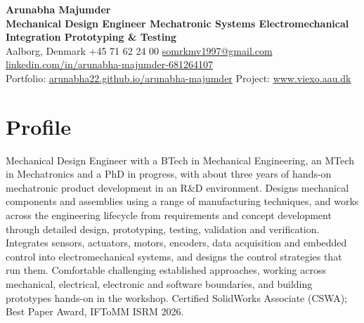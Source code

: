 \documentclass[10pt,a4paper]{article}
\begin{document}
{\LARGE\bfseries Arunabha Majumder}\\[2pt]
\textbf{Mechanical Design Engineer \textbar{} Mechatronic Systems \textbar{} Electromechanical Integration \textbar{} Prototyping \& Testing}\\[2pt]
{\small Aalborg, Denmark \textbar{} +45 71 62 24 00 \textbar{} \href{mailto:somrkmv1997@gmail.com}{somrkmv1997@gmail.com} \textbar{} \href{https://www.linkedin.com/in/arunabha-majumder-681264107}{linkedin.com/in/arunabha-majumder-681264107}\\
Portfolio: \href{https://arunabha22.github.io/arunabha-majumder/}{arunabha22.github.io/arunabha-majumder} \textbar{} Project: \href{https://www.viexo.aau.dk/}{www.viexo.aau.dk}}

\section{Profile}
Mechanical Design Engineer with a BTech in Mechanical Engineering, an MTech in Mechatronics and a PhD in progress, with about three years of hands-on mechatronic product development in an R\&D environment. Designs mechanical components and assemblies using a range of manufacturing techniques, and works across the engineering lifecycle from requirements and concept development through detailed design, prototyping, testing, validation and verification. Integrates sensors, actuators, motors, encoders, data acquisition and embedded control into electromechanical systems, and designs the control strategies that run them. Comfortable challenging established approaches, working across mechanical, electrical, electronic and software boundaries, and building prototypes hands-on in the workshop. Certified SolidWorks Associate (CSWA); Best Paper Award, IFToMM ISRM 2026.
\end{document}
